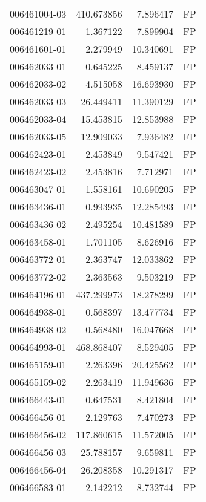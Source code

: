 \begin{tabular}{lrrl}
006461004-03 &  410.673856 &       7.896417 &   FP \\
006461219-01 &    1.367122 &       7.899904 &   FP \\
006461601-01 &    2.279949 &      10.340691 &   FP \\
006462033-01 &    0.645225 &       8.459137 &   FP \\
006462033-02 &    4.515058 &      16.693930 &   FP \\
006462033-03 &   26.449411 &      11.390129 &   FP \\
006462033-04 &   15.453815 &      12.853988 &   FP \\
006462033-05 &   12.909033 &       7.936482 &   FP \\
006462423-01 &    2.453849 &       9.547421 &   FP \\
006462423-02 &    2.453816 &       7.712971 &   FP \\
006463047-01 &    1.558161 &      10.690205 &   FP \\
006463436-01 &    0.993935 &      12.285493 &   FP \\
006463436-02 &    2.495254 &      10.481589 &   FP \\
006463458-01 &    1.701105 &       8.626916 &   FP \\
006463772-01 &    2.363747 &      12.033862 &   FP \\
006463772-02 &    2.363563 &       9.503219 &   FP \\
006464196-01 &  437.299973 &      18.278299 &   FP \\
006464938-01 &    0.568397 &      13.477734 &   FP \\
006464938-02 &    0.568480 &      16.047668 &   FP \\
006464993-01 &  468.868407 &       8.529405 &   FP \\
006465159-01 &    2.263396 &      20.425562 &   FP \\
006465159-02 &    2.263419 &      11.949636 &   FP \\
006466443-01 &    0.647531 &       8.421804 &   FP \\
006466456-01 &    2.129763 &       7.470273 &   FP \\
006466456-02 &  117.860615 &      11.572005 &   FP \\
006466456-03 &   25.788157 &       9.659811 &   FP \\
006466456-04 &   26.208358 &      10.291317 &   FP \\
006466583-01 &    2.142212 &       8.732744 &   FP \\

\end{tabular}
